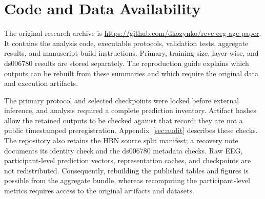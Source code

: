 \section{Code and Data Availability}

The original research archive is \url{https://github.com/dkozynko/reve-eeg-age-paper}.
It contains the analysis code, executable protocols, validation tests, aggregate
results, and manuscript build instructions. Primary, training-size, layer-wise,
and ds006780 results are stored separately. The reproduction guide explains
which outputs can be rebuilt from these summaries and which require the
original data and execution artifacts.

The primary protocol and selected checkpoints were locked before external
inference, and analysis required a complete prediction inventory. Artifact
hashes allow the retained outputs to be checked against that record; they are
not a public timestamped preregistration. Appendix~\ref{sec:audit} describes
these checks. The repository also retains the HBN source split manifest;
a recovery note documents its identity check and the ds006780 metadata checks.
Raw EEG, participant-level prediction vectors, representation caches, and
checkpoints are not redistributed. Consequently, rebuilding the
published tables and figures is possible from the aggregate bundle, whereas
recomputing the participant-level metrics requires access to the original
artifacts and datasets.
